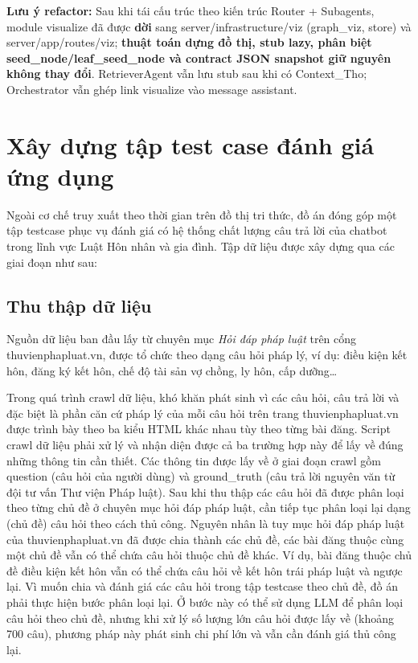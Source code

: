 \documentclass[../DoAn.tex]{subfiles}
\begin{document}
\textbf{Lưu ý refactor:} Sau khi tái cấu trúc theo kiến trúc Router + Subagents, module visualize đã được \textbf{dời} sang server/infrastructure/viz (graph\_viz, store) và server/app/routes/viz; \textbf{thuật toán dựng đồ thị, stub lazy, phân biệt seed\_node/leaf\_seed\_node và contract JSON snapshot giữ nguyên không thay đổi}. RetrieverAgent vẫn lưu stub sau khi có Context\_Tho; Orchestrator vẫn ghép link visualize vào message assistant.

\section{Xây dựng tập test case đánh giá ứng dụng}
\label{subsection:testcase}
Ngoài cơ chế truy xuất theo thời gian trên đồ thị tri thức, đồ án đóng góp một tập testcase phục vụ đánh giá có hệ thống chất lượng câu trả lời của chatbot trong lĩnh vực Luật Hôn nhân và gia đình. Tập dữ liệu được xây dựng qua các giai đoạn như sau:

\subsection{Thu thập dữ liệu}

Nguồn dữ liệu ban đầu lấy từ chuyên mục \textit{Hỏi đáp pháp luật} trên cổng thuvienphapluat.vn, được tổ chức theo dạng câu hỏi pháp lý, ví dụ: điều kiện kết hôn, đăng ký kết hôn, chế độ tài sản vợ chồng, ly hôn, cấp dưỡng\ldots

Trong quá trình crawl dữ liệu, khó khăn phát sinh vì các câu hỏi, câu trả lời và đặc biệt là phần căn cứ pháp lý của mỗi câu hỏi trên trang thuvienphapluat.vn được trình bày theo ba kiểu HTML khác nhau tùy theo từng bài đăng. Script crawl dữ liệu phải xử lý và nhận diện được cả ba trường hợp này để lấy về đúng những thông tin cần thiết. Các thông tin được lấy về ở giai đoạn crawl gồm question (câu hỏi của người dùng) và ground\_truth (câu trả lời nguyên văn từ đội tư vấn Thư viện Pháp luật). Sau khi thu thập các câu hỏi đã được phân loại theo từng chủ đề ở chuyên mục hỏi đáp pháp luật, cần tiếp tục phân loại lại dạng (chủ đề) câu hỏi theo cách thủ công. Nguyên nhân là tuy mục hỏi đáp pháp luật của thuvienphapluat.vn đã được chia thành các chủ đề, các bài đăng thuộc cùng một chủ đề vẫn có thể chứa câu hỏi thuộc chủ đề khác. Ví dụ, bài đăng thuộc chủ đề điều kiện kết hôn vẫn có thể chứa câu hỏi về kết hôn trái pháp luật và ngược lại. Vì muốn chia và đánh giá các câu hỏi trong tập testcase theo chủ đề, đồ án phải thực hiện bước phân loại lại. Ở bước này có thể sử dụng LLM để phân loại câu hỏi theo chủ đề, nhưng khi xử lý số lượng lớn câu hỏi được lấy về (khoảng 700 câu), phương pháp này phát sinh chi phí lớn và vẫn cần đánh giá thủ công lại.
\end{document}
